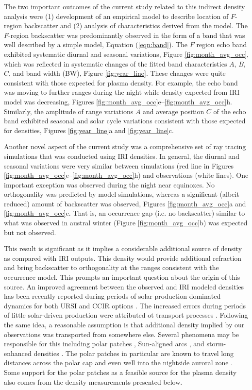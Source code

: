The two important outcomes of the current study related to this indirect density analysis were (1) development of an empirical model to describe location of \(F\)-region backscatter and (2) analysis of characteristics derived from the model. The \(F\)-region backscatter was predominantly observed in the form of a band that was well described by a simple model, Equation (\ref{eqn:band}). The \(F\) region echo band exhibited systematic diurnal and seasonal variations, Figure \ref{fig:month_avg_occ}, which was reflected in systematic changes of the fitted band characteristics \(A\), \(B\), \(C\), and band width (BW), Figure \ref{fig:year_line}. These changes were quite consistent with those expected for plasma density. For example, the echo band was moving to further ranges during the night while density expected from IRI model was decreasing, Figures \ref{fig:month_avg_occ}e--\ref{fig:month_avg_occ}h. Similarly, the amplitude of range variations \(A\) and average position \(C\) of the echo band exhibited seasonal and solar cycle variations consistent with those expected for densities, Figures \ref{fig:year_line}a and \ref{fig:year_line}c.

Another novel aspect of the current study was a comprehensive set of ray tracing simulations that was conducted using IRI densities. In general, the diurnal and seasonal variations were very similar between simulations (red line in Figures \ref{fig:month_avg_occ}e--\ref{fig:month_avg_occ}h) and observations (white lines). One important exception was observed during the night near equinoxes. No orthogonality was predicted by model simulations, whereas a significant (albeit reduced) amount of backscatter was observed, Figures \ref{fig:month_avg_occ}a and \ref{fig:month_avg_occ}c. That is, an occurrence gap (i.e. no backscatter) similar to what was observed in austral winter (Figure \ref{fig:month_avg_occ}b) was expected but not observed.



This result is significant as it implies a considerable additional source of density as compared with IRI outputs. This density would provide additional refraction and bring backscatter to orthogonality at the ranges consistent with the occurrence model.  This prompts an important question about the origin of this source. An improved agreement between the observed and IRI modeled densities has been recently reported during periods of solar production-dominated dynamics for both URSI and CCIR options \citep{Themens2014}.  The increased errors during periods of little solar-driven production were attributed ot transport processes \citep{Themens2014}.  Following the same idea, a reasonable assumption is that additional density implied by our observations was transported from somewhere else.  Several phenomena may be responsible for this including polar patches \citep{Wever1984}, Sun-aligned arcs \citep{Valladares1994}, and storm-enhanced densities \citep{Foster1993}.  The polar patches in particular are known to travel long distances across the polar cap and even well into the nightside auroral zone \citep{Moen2007,Oksavik2010}.  Some support for the polar patches as a feasible source for the plasma density also comes from the density measurements presented below.


